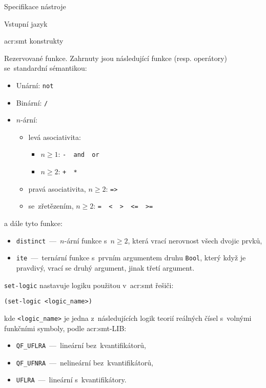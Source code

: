 \documentclass[thesis=M,czech]{FITthesis}[2012/06/26]
\newcommand{\acrlabel}[1]{acr:#1}
\newcommand{\acr}[1]{\acrshort{\acrlabel{#1}}}
\newcommand{\id}[1]{\texttt{#1}}
\begin{document}
\begin{section}{Specifikace nástroje}
\begin{subsection}{Vstupní jazyk}
\begin{subsubsection}{\acr{smt} konstrukty}
\begin{paragraph}{Rezervované funkce.}\label{p:design:spec:ilang:smt:reserved}
Zahrnuty jsou následující funkce (resp. operátory)
se~standardní sémantikou:
\begin{itemize}
\item Unární:  \quad \id{not}
\item Binární: \quad \id{/}
\item $n$-ární:
   \begin{itemize}
   \item levá asociativita:
      \begin{itemize}
      \item ${n \geq 1}$: \quad \id{- \ and \  or}
      \item ${n \geq 2}$: \quad \id{+ \  *}
      \end{itemize}
   \item pravá asociativita, ${n \geq 2}$: \quad \id{=>}
   \item se~zřetězením, ${n \geq 2}$:  \quad \id{= \  < \  > \  <= \  >=}
   \end{itemize}
\end{itemize}
a dále tyto funkce:
\begin{itemize}
\item \id{distinct}~---~$n$-ární funkce s~${n \geq 2}$,
   která vrací nerovnost všech dvojic prvků,
\item \id{ite}~---~ternární funkce s~prvním argumentem druhu \id{Bool},
   který když je pravdivý,
   vrací se druhý argument, jinak třetí argument.
\end{itemize}
\end{paragraph} %


\begin{paragraph}{\id{set-logic}}\label{p:design:spec:ilang:smt:logic}
nastavuje logiku použitou v~\acr{smt} řešiči:
\begin{center}
\id{(set-logic <logic\_\-name>)}
\end{center}
kde \id{<logic\_\-name>} je jedna z~následujících logik
teorií reálných čísel s~volnými funkčními symboly,
podle \acr{smt}-LIB:
\begin{itemize}
\item \id{QF\_\-UFLRA}~---~lineární bez~kvantifikátorů,
\item \id{QF\_\-UFNRA}~---~nelineární bez~kvantifikátorů,
\item \id{UFLRA}~---~lineární s~kvantifikátory.
\end{itemize}


\end{paragraph}
\end{subsubsection}
\end{subsection}
\end{section}
\end{document}
